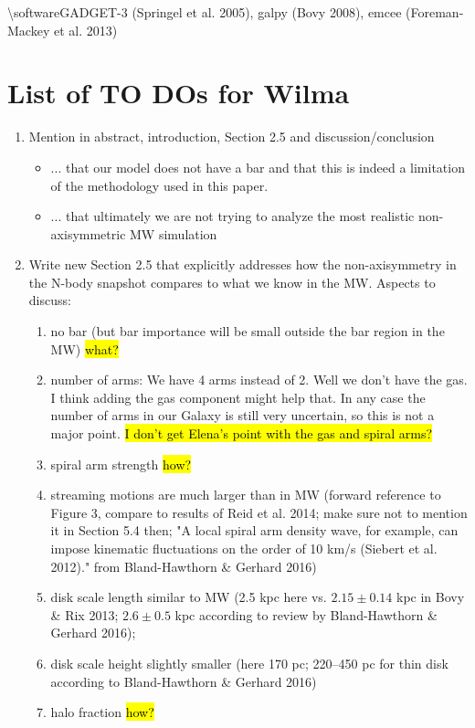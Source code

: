 \documentclass[10pt,a4paper]{article}
\begin{document}
{\textbackslash}software{GADGET-3 (Springel et al. 2005), galpy (Bovy 2008), emcee (Foreman-Mackey
et al. 2013)}

\section{List of TO DOs for Wilma}


\begin{enumerate}
\item Mention in abstract, introduction, Section 2.5 and discussion/conclusion 
\begin{itemize}
\item ... that our model does not have a bar and that this is indeed a limitation of the methodology used in this paper. 
\item ... that ultimately we are not trying to analyze the most realistic non-axisymmetric MW simulation
\end{itemize}
\item Write new Section 2.5 that explicitly addresses how the non-axisymmetry in the N-body snapshot compares to what we know in the MW. Aspects to discuss:
\begin{enumerate}
\item no bar (but bar importance will be small outside the bar region in the MW) \hl{what?}
\item number of arms:  We have 4 arms instead of 2. Well  we don't have the gas. I think adding the gas component might help that. In any case the number of arms in our Galaxy is still very uncertain, so this is not a major point. \hl{I don't get Elena's point with the gas and spiral arms?}
\item spiral arm strength \hl{how?}
\item streaming motions are much larger than in MW (forward reference to Figure 3, compare to results of Reid et al. 2014; make sure not to mention it in Section 5.4 then; "A local spiral arm
density wave, for example, can impose kinematic fluctuations on the order of 10 km/s (Siebert et al. 2012)." from Bland-Hawthorn \& Gerhard 2016)
\item disk scale length similar to MW (2.5 kpc here vs. $2.15\pm0.14$ kpc in Bovy \& Rix 2013; $2.6\pm0.5$ kpc according to review by Bland-Hawthorn \& Gerhard 2016); 
\item disk scale height slightly smaller  (here 170 pc; 220–450 pc for thin disk according to Bland-Hawthorn \& Gerhard 2016)
\item halo fraction \hl{how?}

\end{enumerate}
\end{enumerate}
\end{document}
